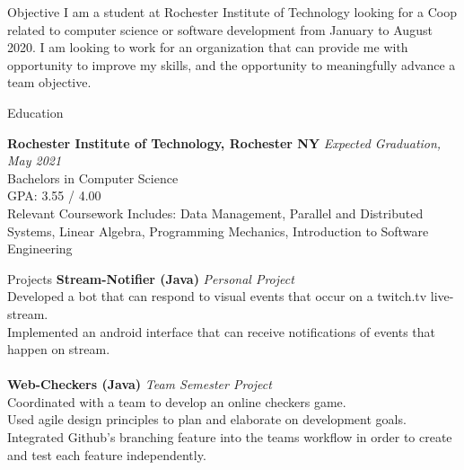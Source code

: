 \documentclass{resume} %
\begin{document}

\begin{rSection}{Objective}
I am a student at Rochester Institute of Technology looking for a Coop related to computer science or software development from January to August 2020. I am looking to work for an organization that can provide me with opportunity to improve my skills, and the opportunity to meaningfully advance a team objective. 
\end{rSection}

\begin{rSection}{Education}

{\bf Rochester Institute of Technology, Rochester NY} \hfill {\em Expected Graduation, May 2021} 
\\ Bachelors in Computer Science
\\ GPA: 3.55 / 4.00
\\ Relevant Coursework Includes:  Data Management, Parallel and Distributed Systems, Linear Algebra, Programming Mechanics, Introduction to Software Engineering 
\end{rSection}

\begin{rSection}{Projects}
{\bf Stream-Notifier (Java)} \hfill {\em Personal Project}
\\Developed a bot that can respond to visual events that occur on a twitch.tv live-stream. 
\\Implemented an android interface that can receive notifications of events that happen on stream.
\\\\{\bf Web-Checkers (Java)} \hfill {\em Team Semester Project}
\\Coordinated with a team to develop an online checkers game.
\\Used agile design principles to plan and elaborate on development goals.
\\Integrated Github's branching feature into the teams workflow in order to create and test each feature independently.

\end{rSection}
\end{document}
